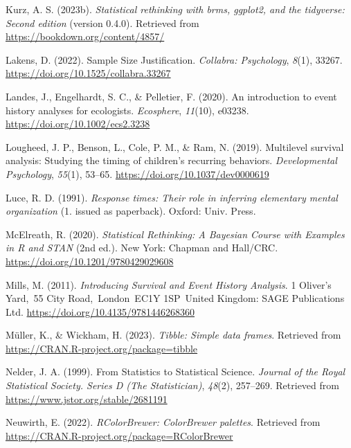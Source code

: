 \documentclass[
  man, donotrepeattitle,floatsintext]{apa6}
\newlength{\cslhangindent}
\newenvironment{CSLReferences}[2] %
 {\begin{list}{}{%
  \setlength{\itemindent}{0pt}
  \setlength{\leftmargin}{0pt}
  \setlength{\parsep}{0pt}
  \ifodd #1
   \setlength{\leftmargin}{\cslhangindent}
   \setlength{\itemindent}{-1\cslhangindent}
  \fi
  \setlength{\itemsep}{#2\baselineskip}}}
 {\end{list}}
\begin{document}
\begin{CSLReferences}{1}{0}
Kurz, A. S. (2023b). \emph{Statistical rethinking with brms, ggplot2, and the tidyverse: {Second} edition} (version 0.4.0). Retrieved from \url{https://bookdown.org/content/4857/}

Lakens, D. (2022). Sample {Size Justification}. \emph{Collabra: Psychology}, \emph{8}(1), 33267. \url{https://doi.org/10.1525/collabra.33267}

Landes, J., Engelhardt, S. C., \& Pelletier, F. (2020). An introduction to event history analyses for ecologists. \emph{Ecosphere}, \emph{11}(10), e03238. \url{https://doi.org/10.1002/ecs2.3238}

Lougheed, J. P., Benson, L., Cole, P. M., \& Ram, N. (2019). Multilevel survival analysis: {Studying} the timing of children's recurring behaviors. \emph{Developmental Psychology}, \emph{55}(1), 53--65. \url{https://doi.org/10.1037/dev0000619}

Luce, R. D. (1991). \emph{Response times: Their role in inferring elementary mental organization} (1. issued as paperback). Oxford: Univ. Press.

McElreath, R. (2020). \emph{Statistical {Rethinking}: {A Bayesian Course} with {Examples} in {R} and {STAN}} (2nd ed.). New York: {Chapman and Hall/CRC}. \url{https://doi.org/10.1201/9780429029608}

Mills, M. (2011). \emph{Introducing {Survival} and {Event History Analysis}}. 1 Oliver's Yard,~55 City Road,~London~EC1Y 1SP~United Kingdom: SAGE Publications Ltd. \url{https://doi.org/10.4135/9781446268360}

Müller, K., \& Wickham, H. (2023). \emph{Tibble: Simple data frames}. Retrieved from \url{https://CRAN.R-project.org/package=tibble}

Nelder, J. A. (1999). From {Statistics} to {Statistical Science}. \emph{Journal of the Royal Statistical Society. Series D (The Statistician)}, \emph{48}(2), 257--269. Retrieved from \url{https://www.jstor.org/stable/2681191}

Neuwirth, E. (2022). \emph{RColorBrewer: ColorBrewer palettes}. Retrieved from \url{https://CRAN.R-project.org/package=RColorBrewer}


\end{CSLReferences}
\end{document}
